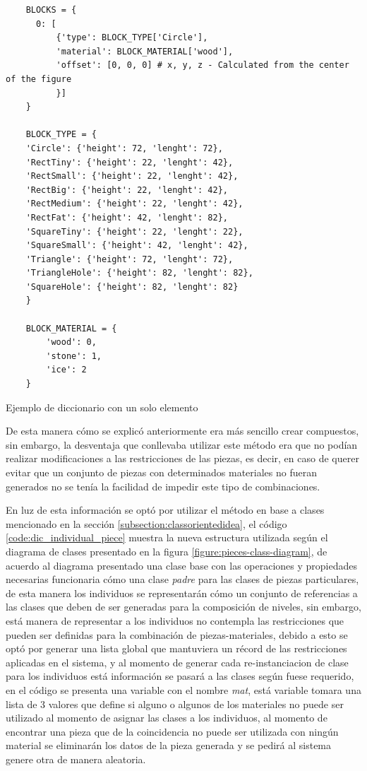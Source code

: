 \begin{listing}[t]
  \begin{verbatim}
    BLOCKS = {
      0: [
          {'type': BLOCK_TYPE['Circle'],
          'material': BLOCK_MATERIAL['wood'],
          'offset': [0, 0, 0] # x, y, z - Calculated from the center of the figure
          }]
    }

    BLOCK_TYPE = {
    'Circle': {'height': 72, 'lenght': 72},
    'RectTiny': {'height': 22, 'lenght': 42},
    'RectSmall': {'height': 22, 'lenght': 42},
    'RectBig': {'height': 22, 'lenght': 42},
    'RectMedium': {'height': 22, 'lenght': 42},
    'RectFat': {'height': 42, 'lenght': 82},
    'SquareTiny': {'height': 22, 'lenght': 22},
    'SquareSmall': {'height': 42, 'lenght': 42},
    'Triangle': {'height': 72, 'lenght': 72},
    'TriangleHole': {'height': 82, 'lenght': 82},
    'SquareHole': {'height': 82, 'lenght': 82}
    }

    BLOCK_MATERIAL = {
        'wood': 0,
        'stone': 1,
        'ice': 2
    }
  \end{verbatim}
  \caption{Ejemplo de diccionario con un solo elemento}
  \label{code:dic_individual_piece}
\end{listing}

De esta manera cómo se explicó anteriormente era más sencillo crear compuestos,
sin embargo, la desventaja que conllevaba utilizar este método era que no podían
realizar modificaciones a las restricciones de las piezas, es decir, en caso de
querer evitar que un conjunto de piezas con determinados materiales no fueran
generados no se tenía la facilidad de impedir este tipo de combinaciones.

En luz de esta información se optó por utilizar el método en base a clases
mencionado en la sección \ref{subsection:classorientedidea}, el código
\ref{code:dic_individual_piece} muestra la nueva estructura utilizada según el
diagrama de clases presentado en la figura \ref{figure:pieces-class-diagram},
de acuerdo al diagrama presentado una clase base con las operaciones y
propiedades necesarias funcionaria cómo una clase \textit{padre} para las clases
de piezas particulares, de esta manera los individuos se representarán cómo un
conjunto de referencias a las clases que deben de ser generadas para la
composición de niveles, sin embargo, está manera de representar a los individuos
no contempla las restricciones que pueden ser definidas para la combinación de
piezas-materiales, debido a esto se optó por generar una lista global que
mantuviera un récord de las restricciones aplicadas en el sistema, y al momento
de generar cada re-instanciacion de clase para los individuos está información se
pasará a las clases según fuese requerido, en el código se presenta una variable
con el nombre \textit{mat}, está variable tomara una lista de 3 valores que
define si alguno o algunos de los materiales no puede ser utilizado al momento
de asignar las clases a los individuos, al momento de encontrar una pieza que de
la coincidencia no puede ser utilizada con ningún material se eliminarán los
datos de la pieza generada y se pedirá al sistema genere otra de manera aleatoria.

